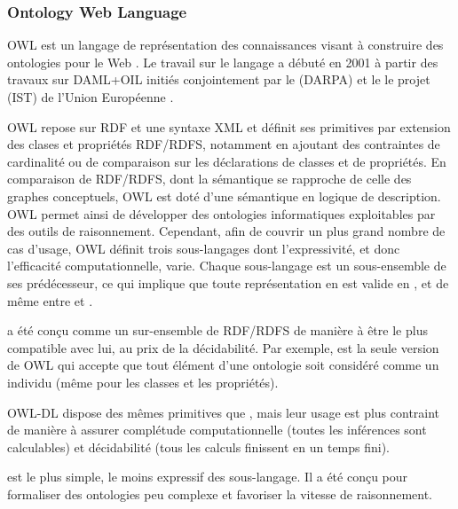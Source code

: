 




\subsubsection{Ontology Web Language}\label{sec:owl}
OWL est un langage de représentation des connaissances visant à construire des ontologies pour le Web .
Le travail sur le langage a débuté en 2001 à partir des travaux sur DAML+OIL initiés conjointement par le  (DARPA) et le le projet  (IST) de l'Union Européenne .

OWL repose sur RDF et une syntaxe XML et définit ses primitives par extension des clases et propriétés RDF/RDFS, notamment en ajoutant des contraintes de cardinalité ou de comparaison sur les déclarations de classes et de propriétés.
En comparaison de RDF/RDFS, dont la sémantique se rapproche de celle des graphes conceptuels, OWL est doté d'une sémantique en logique de description.
OWL permet ainsi de développer des ontologies informatiques exploitables par des outils de raisonnement.
Cependant, afin de couvrir un plus grand nombre de cas d'usage, OWL définit trois sous-langages dont l'expressivité, et donc l'efficacité computationnelle, varie. 
Chaque sous-langage est un sous-ensemble de ses prédécesseur, ce qui implique que toute représentation en  est valide en , et de même entre  et .

\begin{liste}
  \item {} a été conçu comme un sur-ensemble de RDF/RDFS de manière à être le plus compatible avec lui, au prix de la décidabilité.
  Par exemple,  est la seule version de OWL qui accepte que tout élément d'une ontologie soit considéré comme un individu (même pour les classes et les propriétés).

  \item OWL-DL dispose des mêmes primitives que , mais leur usage est plus contraint de manière à assurer complétude computationnelle (toutes les inférences sont calculables) et décidabilité (tous les calculs finissent en un temps fini).

	\item {} est le plus simple, le moins expressif des sous-langage.
  Il a été conçu pour formaliser des ontologies peu complexe et favoriser la vitesse de raisonnement.	
\end{liste}

